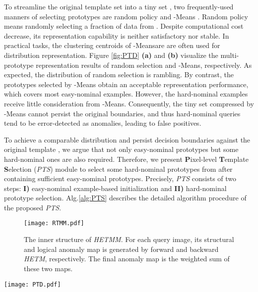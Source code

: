 \documentclass[default,iicol]{sn-jnl}\usepackage[algo2e,ruled,linesnumbered]{algorithm2e}
\theoremstyle{thmstyleone}\newtheorem{theorem}{Theorem}\newtheorem{proposition}[theorem]{Proposition}
\theoremstyle{thmstyletwo}\newtheorem{example}{Example}\newtheorem{remark}{Remark}
\theoremstyle{thmstylethree}\newtheorem{definition}{Definition}
\begin{document}
To streamline the original template set  into a tiny set , two frequently-used manners of selecting  prototypes are random policy and -Means \cite{kmeans}.
Random policy means randomly selecting a fraction of data from .
Despite computational cost decrease, its representation capability is neither satisfactory nor stable.
In practical tasks, the clustering centroids of -Meansare are often used for distribution representation.
Figure \ref{fig:PTD} \textbf{(a)} and \textbf{(b)} visualize the multi-prototype representation results of random selection and -Means, respectively.
As expected, the distribution of random selection is rambling.
By contrast, the prototypes selected by -Means obtain an acceptable representation performance, which covers most easy-nominal examples.
However, the hard-nominal examples receive little consideration from -Means.
Consequently, the tiny set compressed by -Means cannot persist the original boundaries, and thus hard-nominal queries tend to be error-detected as anomalies, leading to false positives.

To achieve a comparable distribution and persist decision boundaries against the original template , we argue that not only easy-nominal prototypes but some hard-nominal ones are also required.
Therefore, we present \textbf{P}ixel-level \textbf{T}emplate \textbf{S}election (\textit{PTS}) module to select some hard-nominal prototypes from  after containing sufficient easy-nominal prototypes.
Precisely, \textit{PTS} consists of two steps: \textbf{I)} easy-nominal example-based initialization and \textbf{II)} hard-nominal prototype selection.
Alg.\ref{alg:PTS} describes the detailed algorithm procedure of the proposed \textit{PTS}.

\begin{figure}[!t]
    \centering
    \texttt{[image: RTMM.pdf]}
    \caption{
        The inner structure of \textit{HETMM}.
        For each query image, its structural and logical anomaly map is generated by forward and backward \textit{HETM}, respectively.
        The final anomaly map is the weighted sum of these two maps.
    }
    \label{fig:RTMM}
\end{figure}

\begin{figure*}[!t]
    \centering
    \texttt{[image: PTD.pdf]}
    \caption{
    The visualization of multi-prototype representation results over the original template set (grey balls) via t-SNE \cite{tsne}.
    Visually, the prototypes selected by random policy \textbf{(a)} are rambling, while -Means \textbf{(b)} only collect easy-nominal prototypes.
    By contrast, \textit{PTS} \textbf{(c)} achieves a better distribution coverage of the original template set, collecting OPTICS \cite{OPTICS} centres (green balls) and hard-nominal prototypes (red balls) to persist the original decision boundaries.
    }
    \label{fig:PTD}
\end{figure*}
\end{document}
